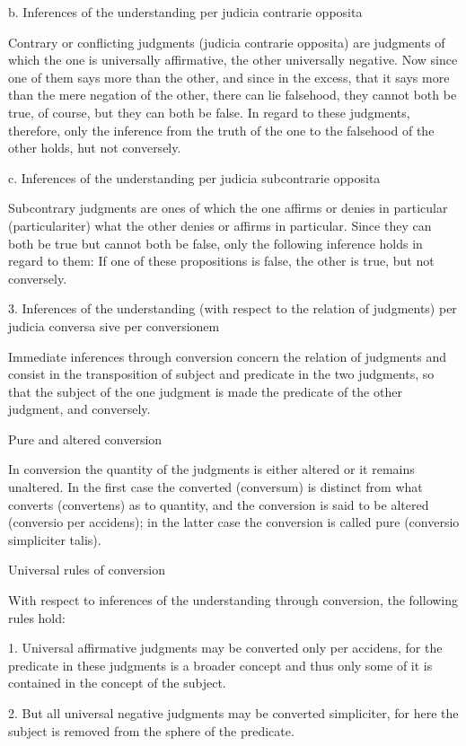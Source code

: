 b. Inferences of the understanding per judicia contrarie opposita

Contrary or conflicting judgments (judicia contrarie opposita)
are judgments of which the one is universally affirmative,
the other universally negative.
Now since one of them says more than the other,
and since in the excess,
that it says more than the mere negation of the other,
there can lie falsehood, they cannot both be true, of course,
but they can both be false.
In regard to these judgments, therefore,
only the inference from the truth of the one
to the falsehood of the other holds, hut not conversely.

c. Inferences of the understanding per judicia subcontrarie opposita

Subcontrary judgments are ones of which
the one affirms or denies in particular (particulariter)
what the other denies or affirms in particular.
Since they can both be true but cannot both be false,
only the following inference holds in regard to them:
If one of these propositions is false,
the other is true, but not conversely.

3. Inferences of the understanding
(with respect to the relation of judgments)
per judicia conversa sive per conversionem

Immediate inferences through conversion
concern the relation of judgments
and consist in the transposition of
subject and predicate in the two judgments,
so that the subject of the one judgment is made
the predicate of the other judgment, and conversely.

Pure and altered conversion

In conversion the quantity of the judgments is
either altered or it remains unaltered.
In the first case the converted (conversum) is
distinct from what converts (convertens) as to quantity,
and the conversion is said to be altered
(conversio per accidens);
in the latter case the conversion is called pure
(conversio simpliciter talis).

Universal rules of conversion

With respect to inferences of the understanding through conversion,
the following rules hold:

1.  Universal affirmative judgments may be converted only per accidens,
    for the predicate in these judgments is a broader concept
    and thus only some of it is contained in the concept of the subject.

2.  But all universal negative judgments may be converted simpliciter,
    for here the subject is removed from the sphere of the predicate.

